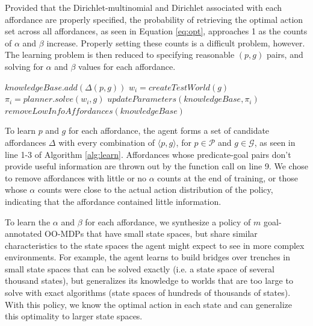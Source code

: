 \documentclass[conference]{IEEEtran}
\begin{document}
Provided that the Dirichlet-multinomial and Dirichlet associated with each
affordance are properly specified, the probability of retrieving the optimal
action set across all affordances, as seen in Equation \ref{eq:opt}, approaches
1 as the counts of $\alpha$ and $\beta$ increase. Properly setting these counts
is a difficult problem, however. The learning problem is then reduced to specifying
reasonable $(p,g)$ pairs, and solving for $\alpha$ and $\beta$ values for each affordance.

\begin{algorithm}
  \caption{$learn(\mathcal{P}, \mathcal{G})$}
  \begin{algorithmic}[1]
    \State $knowledgeBase.add(\Delta(p,g))$
    \EndFor
    \State $w_i = createTestWorld(g)$
    \State $\pi_i = planner.solve(w_i, g)$
    \State $updateParameters(knowledgeBase, \pi_i)$
    \EndFor
    \State $removeLowInfoAffordances(knowledgeBase)$
  \end{algorithmic}
  \label{alg:learn}
\end{algorithm}

To learn $p$ and $g$ for each affordance, the agent forms a set of candidate affordances $\Delta$ with every
combination of $\langle p, g \rangle$, for $p \in \mathcal{P}$ and $g
\in \mathcal{G}$, as seen in line 1-3 of Algorithm \ref{alg:learn}. Affordances
whose predicate-goal pairs don't provide useful information are thrown out by the function call on line 9.
We chose to remove affordances with little or no $\alpha$ counts at the end of training, or those
whose $\alpha$ counts were close to the actual action distribution of the policy, indicating that the affordance
contained little information.

To learn the $\alpha$ and $\beta$ for each
affordance, we synthesize a policy of $m$ goal-annotated
OO-MDPs that have small state spaces, but share similar characteristics
to the state spaces the agent might expect to see in more
complex environments. For example, the agent learns to build bridges
over trenches in small state spaces that can be solved exactly (i.e. a state space of several thousand states), but
generalizes its knowledge to worlds that are too large to
solve with exact algorithms (state spaces of hundreds of thousands of states). With this policy,
we know the optimal action in each state and can generalize this optimality to larger state spaces.
\end{document}
